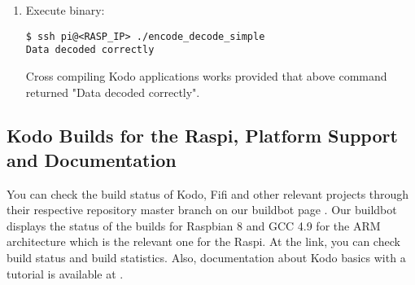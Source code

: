 \begin{enumerate}
\item Execute binary:
\begin{lstlisting}[]
$ ssh pi@<RASP_IP> ./encode_decode_simple
Data decoded correctly
\end{lstlisting}
\FloatBarrier
\vspace{-5mm}

Cross compiling Kodo applications works provided that above command
returned "Data decoded correctly".

%
%
%


\end{enumerate}

\subsection{Kodo Builds for the \ac{Raspi}, Platform Support and Documentation}

You can check the build status of Kodo, Fifi and other relevant projects
through their respective repository master branch on our buildbot page
\cite{steinwurf2016buildbot}. Our buildbot displays the status of the builds
for Raspbian 8 and GCC 4.9 for the ARM architecture which is the relevant one
for the \ac{Raspi}. At the link, you can check build status and build
statistics. Also, documentation about Kodo basics with a tutorial is available
at \cite{kododocs}.






